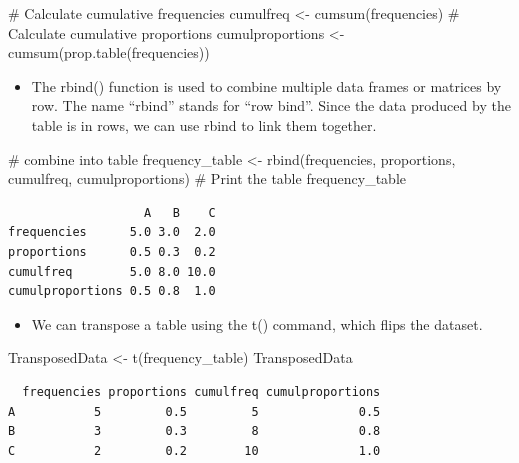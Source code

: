 \documentclass[
  letterpaper,
  DIV=11,
  numbers=noendperiod]{scrreprt}
\newenvironment{Shaded}{\begin{snugshade}}{\end{snugshade}}
\newcommand{\CommentTok}[1]{\textcolor[rgb]{0.37,0.37,0.37}{#1}}
\newcommand{\FunctionTok}[1]{\textcolor[rgb]{0.28,0.35,0.67}{#1}}
\newcommand{\NormalTok}[1]{\textcolor[rgb]{0.00,0.23,0.31}{#1}}
\newcommand{\OtherTok}[1]{\textcolor[rgb]{0.00,0.23,0.31}{#1}}
\providecommand{\tightlist}{%
  \setlength{\itemsep}{0pt}\setlength{\parskip}{0pt}}\usepackage{longtable,booktabs,array}
\begin{document}
\begin{Shaded}
\begin{Highlighting}[]
\CommentTok{\# Calculate cumulative frequencies}
\NormalTok{cumulfreq }\OtherTok{\textless{}{-}} \FunctionTok{cumsum}\NormalTok{(frequencies)}
\CommentTok{\# Calculate cumulative proportions}
\NormalTok{cumulproportions }\OtherTok{\textless{}{-}} \FunctionTok{cumsum}\NormalTok{(}\FunctionTok{prop.table}\NormalTok{(frequencies))}
\end{Highlighting}
\end{Shaded}

\begin{itemize}
\tightlist
\item
  The rbind() function is used to combine multiple data frames or
  matrices by row. The name ``rbind'' stands for ``row bind''. Since the
  data produced by the table is in rows, we can use rbind to link them
  together.
\end{itemize}

\begin{Shaded}
\begin{Highlighting}[]
\CommentTok{\# combine into table}
\NormalTok{frequency\_table }\OtherTok{\textless{}{-}} \FunctionTok{rbind}\NormalTok{(frequencies, proportions, cumulfreq, cumulproportions)}
\CommentTok{\# Print the table}
\NormalTok{frequency\_table}
\end{Highlighting}
\end{Shaded}

\begin{verbatim}
                   A   B    C
frequencies      5.0 3.0  2.0
proportions      0.5 0.3  0.2
cumulfreq        5.0 8.0 10.0
cumulproportions 0.5 0.8  1.0
\end{verbatim}

\begin{itemize}
\tightlist
\item
  We can transpose a table using the t() command, which flips the
  dataset.
\end{itemize}

\begin{Shaded}
\begin{Highlighting}[]
\NormalTok{TransposedData }\OtherTok{\textless{}{-}} \FunctionTok{t}\NormalTok{(frequency\_table)}
\NormalTok{TransposedData}
\end{Highlighting}
\end{Shaded}

\begin{verbatim}
  frequencies proportions cumulfreq cumulproportions
A           5         0.5         5              0.5
B           3         0.3         8              0.8
C           2         0.2        10              1.0
\end{verbatim}
\end{document}
